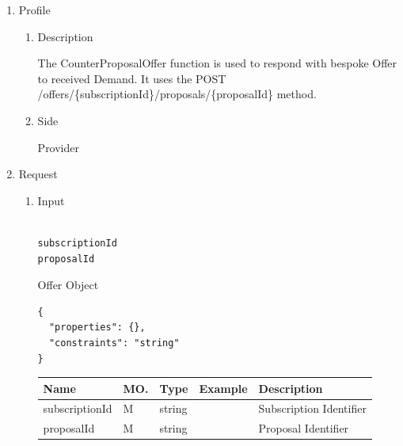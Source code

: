 \newpage


\begin{enumerate}

\item Profile

\begin{enumerate}

\item Description

The CounterProposalOffer function is used to respond with bespoke Offer to received Demand. 
It uses the POST /offers/\{subscriptionId\}/proposals/\{proposalId\} method.

\item Side

Provider

\end{enumerate}

\item Request

\begin{enumerate}

\item Input

\begin{tcolorbox}[boxrule=0pt, frame empty]
\begin{verbatim}

subscriptionId
proposalId

\end{verbatim}
\end{tcolorbox}

Offer Object
\begin{tcolorbox}[boxrule=0pt, frame empty]
\begin{verbatim}
{
  "properties": {},
  "constraints": "string"
}
\end{verbatim}
\end{tcolorbox}

\begin{center}
\begin{tabular}{|p{3cm}|l|p{3cm}|p{3cm}|p{4cm}|} 
\hline
\rowcolor{lightgray}	Name	& MO.	& Type	& Example & 	Description \\
\hline

subscriptionId	& M	& 	string			&		&	Subscription Identifier \\ 

\hline

proposalId		& M & 	string			&		&	Proposal Identifier \\


\end{tabular}
\end{center}
\end{enumerate}
\end{enumerate}
